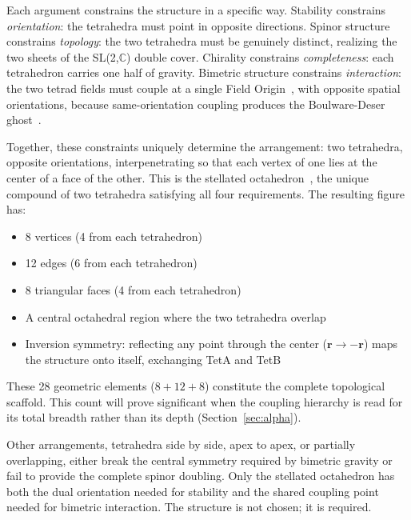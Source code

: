 \documentclass[aps,prd,preprint,superscriptaddress,showpacs,preprintnumbers,amsmath,amssymb,nofootinbib]{revtex4-2}
\begin{document}
Each argument constrains the structure in a specific way. Stability constrains \emph{orientation}: the tetrahedra must point in opposite directions. Spinor structure constrains \emph{topology}: the two tetrahedra must be genuinely distinct, realizing the two sheets of the SL(2,$\mathbb{C}$) double cover. Chirality constrains \emph{completeness}: each tetrahedron carries one half of gravity. Bimetric structure constrains \emph{interaction}: the two tetrad fields must couple at a single Field Origin~\cite{hinterbichler2012}, with opposite spatial orientations, because same-orientation coupling produces the Boulware-Deser ghost~\cite{boulware1972}.

Together, these constraints uniquely determine the arrangement: two tetrahedra, opposite orientations, interpenetrating so that each vertex of one lies at the center of a face of the other. This is the stellated octahedron~\cite{coxeter1973}, the unique compound of two tetrahedra satisfying all four requirements. The resulting figure has:
\begin{itemize}
\item 8 vertices (4 from each tetrahedron)
\item 12 edges (6 from each tetrahedron)
\item 8 triangular faces (4 from each tetrahedron)
\item A central octahedral region where the two tetrahedra overlap
\item Inversion symmetry: reflecting any point through the center ($\mathbf{r} \to -\mathbf{r}$) maps the structure onto itself, exchanging TetA and TetB
\end{itemize}

\noindent
These 28 geometric elements ($8 + 12 + 8$) constitute the complete topological scaffold. This count will prove significant when the coupling hierarchy is read for its total breadth rather than its depth (Section~\ref{sec:alpha}).

Other arrangements, tetrahedra side by side, apex to apex, or partially overlapping, either break the central symmetry required by bimetric gravity or fail to provide the complete spinor doubling. Only the stellated octahedron has both the dual orientation needed for stability and the shared coupling point needed for bimetric interaction. The structure is not chosen; it is required.
\end{document}
